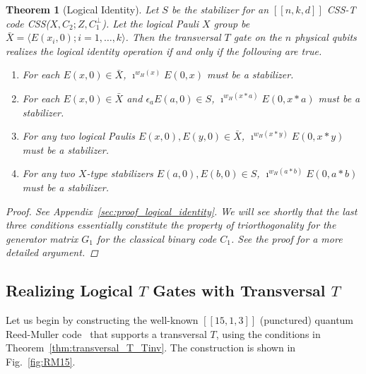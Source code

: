\documentclass[twoside,romanappendices]{IEEEtran}
\newtheorem{theorem}{Theorem}
\newcommand{\llbr}{[\![}
\newcommand{\rrbr}{]\!]}
\begin{document}
\begin{theorem}[Logical Identity]
\label{thm:logical_identity}
Let $S$ be the stabilizer for an $\llbr n,k,d \rrbr$ CSS-T code CSS($X, C_2 ; Z, C_1^{\perp}$).
Let the logical Pauli $X$ group be $\bar{X} = \langle E(x_i,0) ; i = 1,\ldots,k \rangle$. 
Then the transversal $T$ gate on the $n$ physical qubits realizes the logical identity operation if and only if the following are true.
\begin{enumerate}

\item For each $E(x,0) \in \bar{X}$, $\imath^{w_H(x)} E(0,x)$ must be a stabilizer.

\item For each $E(x,0) \in \bar{X}$ and $\epsilon_a E(a,0) \in S$, $\imath^{w_H(x \ast a)} E(0,x \ast a)$ must be a stabilizer.

\item For any two logical Paulis $E(x,0), E(y,0) \in \bar{X}$, $\imath^{w_H(x \ast y)} E(0, x \ast y)$ must be a stabilizer.

\item For any two $X$-type stabilizers $E(a,0), E(b,0) \in S$, $\imath^{w_H(a \ast b)} E(0, a \ast b)$ must be a stabilizer.

\end{enumerate}
\begin{proof}
See Appendix~\ref{sec:proof_logical_identity}.
We will see shortly that the last three conditions essentially constitute the property of \emph{triorthogonality} for the generator matrix $G_1$ for the classical binary code $C_1$.
See the proof for a more detailed argument.
\end{proof}
\end{theorem}



\subsection{Realizing Logical $T$ Gates with Transversal $T$}
\label{sec:logical_T}



Let us begin by constructing the well-known $\llbr 15,1,3 \rrbr$ (punctured) quantum Reed-Muller code~\cite{Anderson-prl14,Quan-jpmt18} that supports a transversal $T$, using the conditions in Theorem~\ref{thm:transversal_T_Tinv}.
The construction is shown in Fig.~\ref{fig:RM15}.
\end{document}
